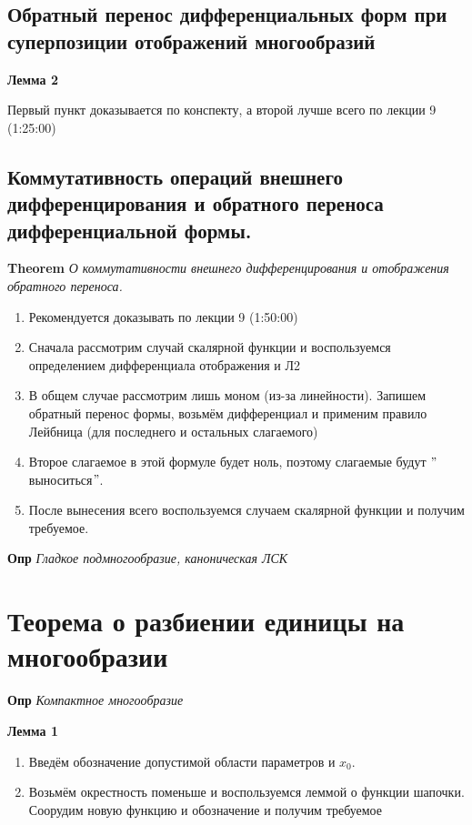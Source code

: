 \documentclass[a4paper, 14pt]{article}
\begin{document}
    \subsection{Обратный перенос дифференциальных форм при суперпозиции отображений многообразий}
    
    \textbf{Лемма 2}
    
    Первый пункт доказывается по конспекту, а второй лучше всего по лекции 9 (1:25:00)
    
    \subsection{Коммутативность операций внешнего дифференцирования и обратного переноса дифференциальной формы.}
    
    \textbf{Theorem} \textit{О коммутативности внешнего дифференцирования и отображения обратного переноса.}
    
    \begin{enumerate}
        \item Рекомендуется доказывать по лекции 9 (1:50:00)
        \item Сначала рассмотрим случай скалярной функции и воспользуемся определением дифференциала отображения и Л2
        \item В общем случае рассмотрим лишь моном (из-за линейности).
        Запишем обратный перенос формы, возьмём дифференциал и применим правило Лейбница (для последнего и остальных
        слагаемого)
        \item Второе слагаемое в этой формуле будет ноль, поэтому слагаемые будут \("\)выноситься\("\).
        \item После вынесения всего воспользуемся случаем скалярной функции и получим требуемое.
    \end{enumerate}
    
    \textbf{Опр} \textit{Гладкое подмногообразие, каноническая ЛСК}
    
    \section{Теорема о разбиении единицы на многообразии}
    
    \textbf{Опр} \textit{Компактное многообразие}
    
    \textbf{Лемма 1}
    
    \begin{enumerate}
        \item Введём обозначение допустимой области параметров и $x_0$.
        \item Возьмём окрестность поменьше и воспользуемся леммой о функции шапочки.
        Соорудим новую функцию и обозначение и получим требуемое
    \end{enumerate}
    
\end{document}
